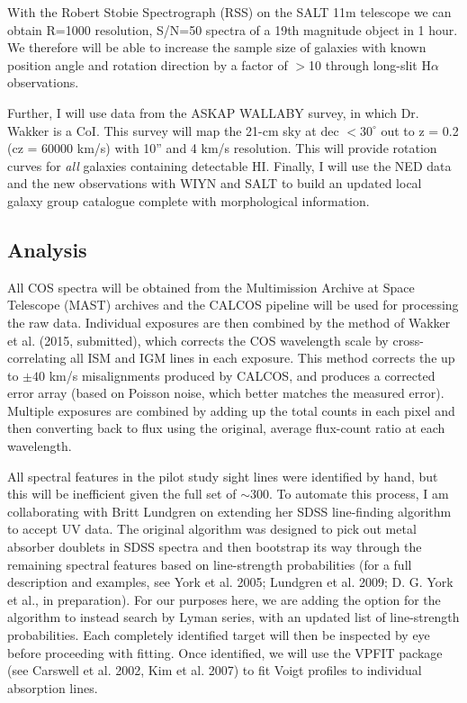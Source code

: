 \documentclass[iop]{emulateapj-rtx4}
\begin{document}
With the Robert Stobie Spectrograph (RSS) on the SALT 11m telescope we can obtain R=1000 resolution, S/N=50 spectra of a 19th magnitude object in 1 hour. We therefore will be able to increase the sample size of galaxies with known position angle and rotation direction by a factor of $>$10 through long-slit H$\alpha$ observations. 

Further, I will use data from the ASKAP WALLABY survey, in which Dr. Wakker is a CoI. This survey will map the 21-cm sky at dec $<30^{\circ}$ out to z = 0.2 (cz = 60000 km/s) with 10'' and 4 km/s resolution. This will provide rotation curves for \emph{all} galaxies containing detectable HI. Finally, I will use the NED data and the new observations with WIYN and SALT to build an updated local galaxy group catalogue complete with morphological information.


\subsection{Analysis}
All COS spectra will be obtained from the Multimission Archive at Space Telescope (MAST) archives and the CALCOS pipeline will be used for processing the raw data. Individual exposures are then combined by the method of Wakker et al. (2015, submitted), which corrects the COS wavelength scale by cross-correlating all ISM and IGM lines in each exposure. This method corrects the up to $\pm40$ km/s misalignments produced by CALCOS, and produces a corrected error array (based on Poisson noise, which better matches the measured error). Multiple exposures are combined by adding up the total counts in each pixel and then converting back to flux using the original, average flux-count ratio at each wavelength.

All spectral features in the pilot study sight lines were identified by hand, but this will be inefficient given the full set of $\sim300$. To automate this process, I am collaborating with Britt Lundgren on extending her SDSS line-finding algorithm to accept UV data. The original algorithm was designed to pick out metal absorber doublets in SDSS spectra and then bootstrap its way through the remaining spectral features based on line-strength probabilities (for a full description and examples, see York et al. 2005; Lundgren et al. 2009; D. G. York et al., in preparation). For our purposes here, we are adding the option for the algorithm to instead search by Lyman series, with an updated list of line-strength probabilities. Each completely identified target will then be inspected by eye before proceeding with fitting. Once identified, we will use the VPFIT package (see Carswell et al. 2002, Kim et al. 2007) to fit Voigt profiles to individual absorption lines. 
\end{document}
